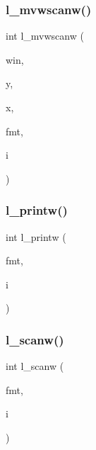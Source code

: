 \mbox{\label{C-macros_8c_afd4ce2c83673e3073a46a6c0e05b235b}} 
\subsubsection{\texorpdfstring{l\+\_\+mvwscanw()}{l\_mvwscanw()}}
{\footnotesize\ttfamily int l\+\_\+mvwscanw (\begin{DoxyParamCaption}\item[{W\+I\+N\+D\+OW $\ast$}]{win,  }\item[{int}]{y,  }\item[{int}]{x,  }\item[{char $\ast$}]{fmt,  }\item[{long $\ast$}]{i }\end{DoxyParamCaption})}

\mbox{\label{C-macros_8c_a438f19725af6b5016916144895acf478}} 
\subsubsection{\texorpdfstring{l\+\_\+printw()}{l\_printw()}}
{\footnotesize\ttfamily int l\+\_\+printw (\begin{DoxyParamCaption}\item[{const char $\ast$}]{fmt,  }\item[{long}]{i }\end{DoxyParamCaption})}

\mbox{\label{C-macros_8c_ac941da9228821610096cdf7a8dc6af56}} 
\subsubsection{\texorpdfstring{l\+\_\+scanw()}{l\_scanw()}}
{\footnotesize\ttfamily int l\+\_\+scanw (\begin{DoxyParamCaption}\item[{char $\ast$}]{fmt,  }\item[{long $\ast$}]{i }\end{DoxyParamCaption})}

